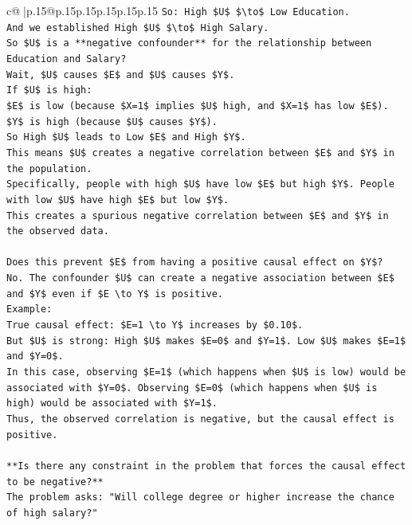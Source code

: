 \documentclass{article}
\begin{document}
{\begin{supertabular}{c@{$\;$}|p{.15\linewidth}@{}p{.15\linewidth}p{.15\linewidth}p{.15\linewidth}p{.15\linewidth}p{.15\linewidth}}
{{{\texttt{So: High \$U\$ \$\textbackslash{}to\$ Low Education.} \\
\texttt{And we established High \$U\$ \$\textbackslash{}to\$ High Salary.} \\
\texttt{So \$U\$ is a **negative confounder** for the relationship between Education and Salary?} \\
\texttt{Wait, \$U\$ causes \$E\$ and \$U\$ causes \$Y\$.} \\
\texttt{If \$U\$ is high:} \\
\texttt{\$E\$ is low (because \$X=1\$ implies \$U\$ high, and \$X=1\$ has low \$E\$).} \\
\texttt{\$Y\$ is high (because \$U\$ causes \$Y\$).} \\
\texttt{So High \$U\$ leads to Low \$E\$ and High \$Y\$.} \\
\texttt{This means \$U\$ creates a negative correlation between \$E\$ and \$Y\$ in the population.} \\
\texttt{Specifically, people with high \$U\$ have low \$E\$ but high \$Y\$. People with low \$U\$ have high \$E\$ but low \$Y\$.} \\
\texttt{This creates a spurious negative correlation between \$E\$ and \$Y\$ in the observed data.} \\
\\ 
\texttt{Does this prevent \$E\$ from having a positive causal effect on \$Y\$?} \\
\texttt{No. The confounder \$U\$ can create a negative association between \$E\$ and \$Y\$ even if \$E \textbackslash{}to Y\$ is positive.} \\
\texttt{Example:} \\
\texttt{True causal effect: \$E=1 \textbackslash{}to Y\$ increases by \$0.10\$.} \\
\texttt{But \$U\$ is strong: High \$U\$ makes \$E=0\$ and \$Y=1\$. Low \$U\$ makes \$E=1\$ and \$Y=0\$.} \\
\texttt{In this case, observing \$E=1\$ (which happens when \$U\$ is low) would be associated with \$Y=0\$. Observing \$E=0\$ (which happens when \$U\$ is high) would be associated with \$Y=1\$.} \\
\texttt{Thus, the observed correlation is negative, but the causal effect is positive.} \\
\\ 
\texttt{**Is there any constraint in the problem that forces the causal effect to be negative?**} \\
\texttt{The problem asks: "Will college degree or higher increase the chance of high salary?"} \\
}}}
\end{supertabular}}
\end{document}
